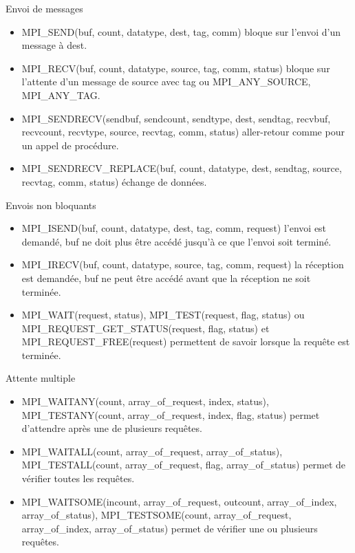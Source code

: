 \documentclass[10pt]{beamer}
\begin{document}
\begin{frame}{Envoi de messages}

  \begin{itemize}
    \item MPI\_SEND(buf, count, datatype, dest, tag, comm) bloque sur l'envoi d'un message à dest.

    \item MPI\_RECV(buf, count, datatype, source, tag, comm, status) bloque sur l'attente d'un message de source avec tag ou MPI\_ANY\_SOURCE, MPI\_ANY\_TAG.

    \item MPI\_SENDRECV(sendbuf, sendcount, sendtype, dest, sendtag, recvbuf, recvcount, recvtype, source, recvtag, comm, status) aller-retour comme pour un appel de procédure.

    \item MPI\_SENDRECV\_REPLACE(buf, count, datatype, dest, sendtag, source, recvtag, comm, status) échange de données.
  \end{itemize}
\end{frame}

\begin{frame}{Envois non bloquants}

  \begin{itemize}
    \item MPI\_ISEND(buf, count, datatype, dest, tag, comm, request) l'envoi est demandé, buf ne doit plus être accédé jusqu'à ce que l'envoi soit terminé.

    \item MPI\_IRECV(buf, count, datatype, source, tag, comm, request) la réception est demandée, buf ne peut être accédé avant que la réception ne soit terminée.

    \item MPI\_WAIT(request, status), MPI\_TEST(request, flag, status) ou MPI\_REQUEST\_GET\_STATUS(request, flag, status) et MPI\_REQUEST\_FREE(request) permettent de savoir lorsque la requête est terminée.
  \end{itemize}
\end{frame}

\begin{frame}{Attente multiple}

  \begin{itemize}
    \item MPI\_WAITANY(count, array\_of\_request, index, status), MPI\_TESTANY(count, array\_of\_request, index, flag, status) permet d'attendre après une de plusieurs requêtes.

    \item MPI\_WAITALL(count, array\_of\_request, array\_of\_status), MPI\_TESTALL(count, array\_of\_request, flag, array\_of\_status) permet de vérifier toutes les requêtes.

    \item MPI\_WAITSOME(incount, array\_of\_request, outcount, array\_of\_index, array\_of\_status), MPI\_TESTSOME(count, array\_of\_request, array\_of\_index, array\_of\_status) permet de vérifier une ou plusieurs requêtes.
  \end{itemize}
\end{frame}
\end{document}
